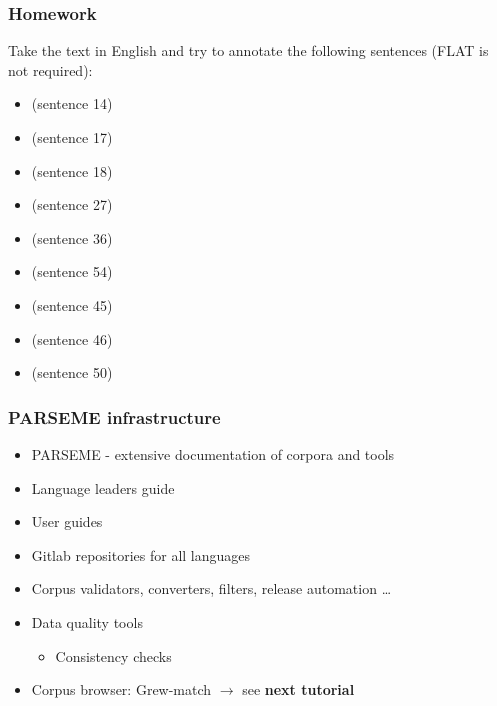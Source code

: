 \documentclass[xcolor=dvipsnames]{beamer}
\begin{document}
\begin{frame} 
\frametitle{Homework}

Take the text in English \href{https://github.com/UniDive/2023-unidive-webinar/blob/main/parseme-tutorial/corpus-en.txt}{} and try to annotate the following sentences (FLAT is not required):

\begin{block}{}
\begin{itemize}
\item {} (sentence 14)
\item {} (sentence 17)
\item {} (sentence 18)
\item {} (sentence 27)
\item {} (sentence 36)
\item {} (sentence 54)
\item {} (sentence 45)
\item {} (sentence 46)
\item {} (sentence 50)
\end{itemize}
\end{block}

\end{frame}

\begin{frame} 
\frametitle{PARSEME infrastructure}

\begin{block}{}
\begin{itemize}
\item PARSEME \href{https://gitlab.com/parseme/corpora/-/wikis}{\beamergotobutton{[wiki]}} - extensive documentation of corpora and tools  
\item Language leaders guide
\item User guides
\item Gitlab repositories for all languages %
\item Corpus validators, converters, filters, release automation \ldots
\item Data quality tools
   \begin{itemize}
   \item Consistency checks %
   \end{itemize} 
\item Corpus browser: Grew-match $\longrightarrow$ see \textbf{next tutorial}
\end{itemize}
\end{block}

\end{frame}
\end{document}
